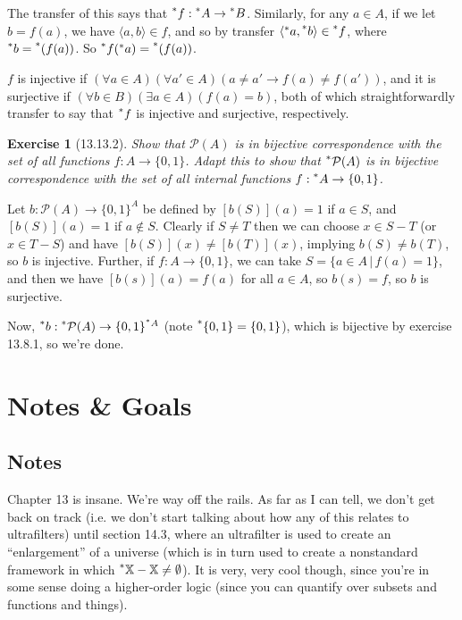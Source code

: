 \documentclass{article}
\newcommand{\hr}[1]{\prescript{*}{}{#1}}
\newtheorem*{exercise}{Exercise}
\begin{document}
The transfer of this says that $\hr{f}: \hr{A} \to \hr{B}$. Similarly, for any $a \in A$, if we let $b = f(a)$, we have $\langle a, b \rangle \in f$, and so by transfer $\langle \hr{a}, \hr{b} \rangle \in \hr{f}$, where $\hr{b} = \hr{(f(a))}$. So $\hr{f}(\hr{a}) = \hr{(f(a))}$.

$f$ is injective if $(\forall a \in A)(\forall a' \in A)(a \neq a' \to f(a) \neq f(a'))$, and it is surjective if $(\forall b \in B)(\exists a \in A)(f(a) = b)$, both of which straightforwardly transfer to say that $\hr{f}$ is injective and surjective, respectively.

\begin{exercise}[13.13.2]
    Show that $\mathcal P(A)$ is in bijective correspondence with the set of all functions $f: A \to \{0, 1\}$. Adapt this to show that $\hr{\mathcal{P}}(A)$ is in bijective correspondence with the set of all \textit{internal} functions $f: \hr{A} \to \{0, 1\}$.
\end{exercise}

Let $b: \mathcal P(A) \to \{0, 1\}^A$ be defined by $[b(S)](a) = 1$ if $a \in S$, and $[b(S)](a) = 1$ if $a \notin S$. Clearly if $S \neq T$ then we can choose $x \in S - T$ (or $x \in T - S$) and have $[b(S)](x) \neq [b(T)](x)$, implying $b(S) \neq b(T)$, so $b$ is injective. Further, if $f: A \to \{0, 1\}$, we can take $S = \{a \in A \,|\, f(a) = 1\}$, and then we have $[b(s)](a) = f(a)$ for all $a \in A$, so $b(s) = f$, so $b$ is surjective.

Now, $\hr{b}: \hr{\mathcal{P}}(A) \to \{0, 1\}^{\hr{A}}$ (note $\hr{\{0, 1\}} = \{0, 1\}$), which is bijective by exercise 13.8.1, so we're done.

\section{Notes \& Goals}
\subsection{Notes}
Chapter 13 is insane. We're way off the rails. As far as I can tell, we don't get back on track (i.e. we don't start talking about how any of this relates to ultrafilters) until section 14.3, where an ultrafilter is used to create an ``enlargement'' of a universe (which is in turn used to create a nonstandard framework in which $\hr{\mathbb{X}} - \mathbb{X} \neq \emptyset$). It is very, very cool though, since you're in some sense doing a higher-order logic (since you can quantify over subsets and functions and things).
\end{document}

